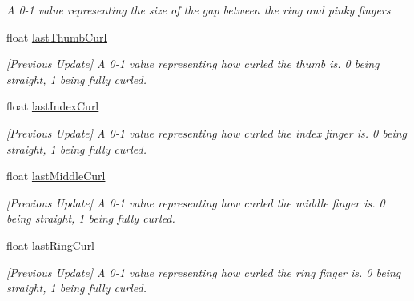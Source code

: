 \begin{DoxyCompactItemize}
\begin{DoxyCompactList}\small\item\em A 0-\/1 value representing the size of the gap between the ring and pinky fingers \end{DoxyCompactList}\item 
float \mbox{\hyperlink{class_valve_1_1_v_r_1_1_steam_v_r___action___skeleton_af5079276a5c75672dfeb3ac2b9d340c1}{last\+Thumb\+Curl}}
\begin{DoxyCompactList}\small\item\em \mbox{[}Previous Update\mbox{]} A 0-\/1 value representing how curled the thumb is. 0 being straight, 1 being fully curled. \end{DoxyCompactList}\item 
float \mbox{\hyperlink{class_valve_1_1_v_r_1_1_steam_v_r___action___skeleton_a4b919dd07d6e23badae877e2e9cc1f26}{last\+Index\+Curl}}
\begin{DoxyCompactList}\small\item\em \mbox{[}Previous Update\mbox{]} A 0-\/1 value representing how curled the index finger is. 0 being straight, 1 being fully curled. \end{DoxyCompactList}\item 
float \mbox{\hyperlink{class_valve_1_1_v_r_1_1_steam_v_r___action___skeleton_a4abb4a7ed42fb3f1c452e069dead3077}{last\+Middle\+Curl}}
\begin{DoxyCompactList}\small\item\em \mbox{[}Previous Update\mbox{]} A 0-\/1 value representing how curled the middle finger is. 0 being straight, 1 being fully curled. \end{DoxyCompactList}\item 
float \mbox{\hyperlink{class_valve_1_1_v_r_1_1_steam_v_r___action___skeleton_a7d76c5fdea67897391423e6897a7ae5c}{last\+Ring\+Curl}}
\begin{DoxyCompactList}\small\item\em \mbox{[}Previous Update\mbox{]} A 0-\/1 value representing how curled the ring finger is. 0 being straight, 1 being fully curled. \end{DoxyCompactList}\item 

\end{DoxyCompactItemize}
